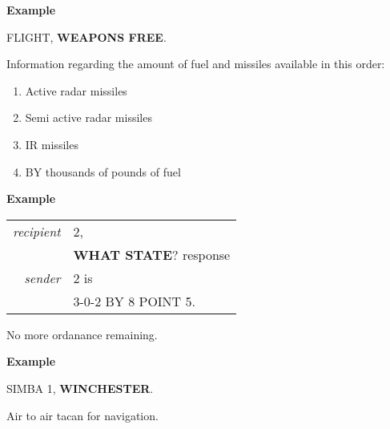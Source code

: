 \begin{tcoloritemize}
    \medskip
    \textbf{Example}
    \begin{center}
        \begin{minipage}{0.9\textwidth}
            FLIGHT, \textbf{WEAPONS FREE}.
        \end{minipage}
    \end{center}

    Information regarding the amount of fuel and missiles available in this order:
    \begin{enumerate}
        \item Active radar missiles
        \item Semi active radar missiles
        \item IR missiles
        \item BY thousands of pounds of fuel
    \end{enumerate}

    \medskip
    \textbf{Example}
    \begin{center}
        \begin{tabular}{>{\itshape}r l}
            recipient & 2, \\
            & \textbf{WHAT STATE}?
            response \\
            sender & 2 is   \\
            & 3-0-2 BY 8 POINT 5. \\
        \end{tabular}
    \end{center}

    \blueitem[WINCHESTER]
    No more ordanance remaining.

    \medskip
    \textbf{Example}
    \begin{center}
        \begin{minipage}{0.9\textwidth}
            SIMBA 1, \textbf{WINCHESTER}.
        \end{minipage}
    \end{center}

    \blueitem[YARDSTICK]
    Air to air tacan for navigation.

\end{tcoloritemize}
